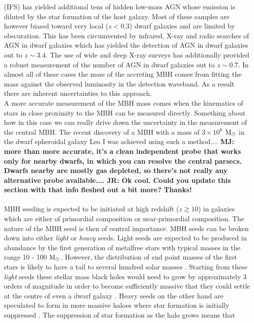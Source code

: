 \documentclass[twocolumn, tighten]{aastex631}
\newcommand{\msolar} {$\rm{M_{\odot}}~$}
\newcommand{\msolarc} {$\rm{M_{\odot}}$}
\def\jr#1{{\color{orange} \bf JR:  #1}}
\def\majo#1{{\color{brown} \bf MJ:  #1}}
\begin{document}
(IFS) has yielded additional tens of hidden low-mass AGN whose emission is diluted by the star formation of the host galaxy. Most of these samples are however biased toward very local ($z < 0.3$) dwarf galaxies and are limited by obscuration. This has been circumvented by infrared, X-ray and radio searches of AGN in dwarf galaxies which has yielded the detection of AGN in dwarf galaxies out to $z \sim 3.4$. The use of wide and deep X-ray surveys has additionally provided a robust measurement of the number of AGN in dwarf galaxies out to $z \sim 0.7$. In almost all of these cases the mass of the accreting MBH comes from fitting the mass against the observed luminosity 
in the detection waveband. As a result there are inherent uncertainties to this approach. \\
\indent A more accurate measurement of the MBH mass comes when the kinematics of stars in close proximity to the MBH can be measured directly. Something about how in this case we can really drive down the uncertainty in the measurement of the central MBH. The recent discovery of a MBH with a mass of $ 3 \times 10^6$ \msolar in the dwarf spheroidal galaxy Leo I was achieved using such a method....
\majo{more than more accurate, it's a clean independent probe that works only for nearby dwarfs, in which you can resolve the central parsecs. Dwarfs nearby are mostly gas depleted, so there's not really any alternative probe available....} \jr{Ok cool. Could you update this section with that info fleshed out a bit more? Thanks!}
\\ \\
MBH seeding is expected to be initiated at high redshift ($z \gtrsim 10$) in galaxies which are either of primordial composition or near-primordial composition. 
The nature of the MBH seed is then of central importance. MBH seeds can be broken down into either \textit{light} or \textit{heavy} seeds. Light seeds are expected to be produced in abundance by the first generation of metalfree stars with typical masses in the range 10 - 100 \msolarc \citep[e.g.][]{Turk_2012, Stacy_2016}. However, the distribution of end point masses of the 
first stars is likely to have a tail to several hundred solar masses \citep[e.g.][]{Hirano_2014}. Starting from these \textit{light} seeds these stellar mass black holes would need to grow by approximately 3 orders of magnitude in order to become sufficiently massive that they could settle at the centre of even a dwarf galaxy \citep{Pfister_2019}. Heavy seeds on the other hand are speculated to form in more massive haloes where star formation is initially suppressed \citep{Loeb_2001, Haiman_2006, Volonteri_2012}. The suppression of star formation as the halo grows means that
\end{document}
